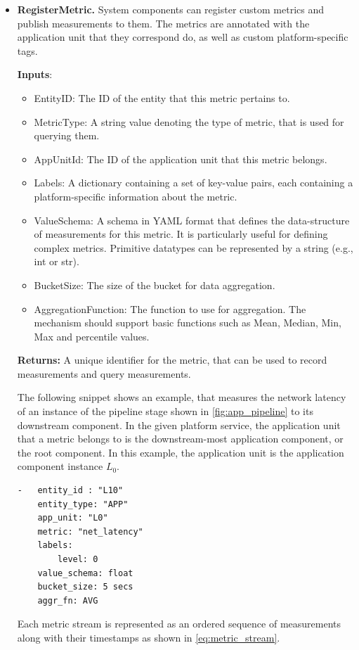 \begin{itemize}
\item \textbf{RegisterMetric.} System components can register custom metrics and publish measurements to them. The metrics are annotated with the application unit that they correspond do, as well as custom platform-specific tags. 
\par \noindent \textbf{Inputs}:
\begin{itemize}
\item EntityID: The ID of the entity that this metric pertains to.
\item MetricType: A string value denoting the type of metric, that is used for querying them.
\item AppUnitId: The ID of the application unit that this metric belongs.
\item Labels: A dictionary containing a set of key-value pairs, each containing a platform-specific information about the metric.
\item ValueSchema: A schema in YAML format that defines the data-structure of measurements for this metric. It is particularly useful for defining complex metrics. Primitive datatypes can be represented by a string (e.g., int or str).
\item BucketSize: The size of the bucket for data aggregation.
\item AggregationFunction: The function to use for aggregation. The mechanism should support basic functions such as Mean, Median, Min, Max and percentile values.
\end{itemize}
\par \noindent \textbf{Returns: } A unique identifier for the metric, that can be used to record measurements and query measurements.
\par The following snippet shows an example, that measures the network latency of an instance of the pipeline stage shown in \cref{fig:app_pipeline} to its downstream component. In the given platform service, the application unit that a metric belongs to is the downstream-most application component, or the root component. In this example, the application unit is the application component instance $L_0$. 
\begin{verbatim}
-   entity_id : "L10"
    entity_type: "APP"
    app_unit: "L0"
    metric: "net_latency"
    labels:
        level: 0
    value_schema: float
    bucket_size: 5 secs
    aggr_fn: AVG
\end{verbatim}
Each metric stream is represented as an ordered sequence of measurements along with their timestamps as shown in \cref{eq:metric_stream}.

\end{itemize}
